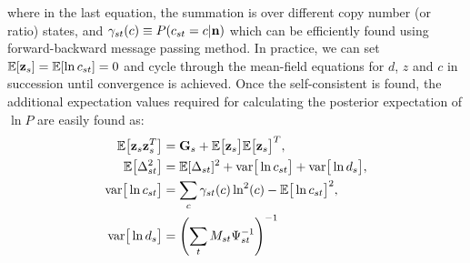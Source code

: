 \documentclass[nofootinbib,amssymb,amsmath]{revtex4}
\newcommand{\vz}{{\bf z}}
\newcommand{\vn}{{\bf n}}
\newcommand{\vG}{{\bf G}}
\newcommand{\EE}{\mathbb{E}}
\begin{document}
where in the last equation, the summation is over different copy number (or ratio) states, and $\gamma_{st}(c) \equiv P(c_{st} = c | \vn)$ which can be efficiently found using forward-backward message passing method. In practice, we can set $\EE[\vz_s] = \EE[\ln c_{st}] = 0$ and cycle through the mean-field equations for $d$, $z$ and $c$ in succession until convergence is achieved. Once the self-consistent is found, the additional expectation values required for calculating the posterior expectation of $\ln P$ are easily found as:
\begin{align}
\EE\big[\vz_s \vz_s^T \big] &= \vG_s + \EE\big[\vz_s\big] \EE\big[\vz_s\big]^T,\nonumber\\
\EE\big[\Delta_{st}^2\big] &= \EE[\Delta_{st}]^2 + \mathrm{var}\big[\ln c_{st}\big] + \mathrm{var}\big[\ln d_{s}\big],\nonumber\\
\mathrm{var}\big[\ln c_{st}\big] &= \sum_{c} \gamma_{st}(c) \ln^2(c) - \EE\big[\ln c_{st}\big]^2,\nonumber\\
\mathrm{var}\big[\ln d_s\big] &= \left(\sum_t M_{st} \Psi_{st}^{-1}\right)^{-1}
\end{align}
\end{document}
